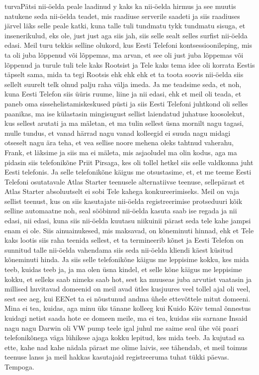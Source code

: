 turvaPätsi nii-öelda peale laadinud y kaks ka nii-öelda hirmus ja see muutis natukene seda nii-öelda teadet, mis raadiuse serverile saadeti ja siis raadiuses järvel läks selle peale katki, kuna talle tuli tundmatu tykk tundmatu sisuga, et insenerikulud, eks ole, just just aga siis jah, siis selle sealt selles surfist nii-öelda edasi. Meil turu tekkis selline olukord, kus Eesti Telefoni kontsessioonileping, mis ta oli juba lõppenud või lõppemas, ma arvan, et see oli just juba lõppemas või lõppenud ja turule tuli tele kaks Rootsist ja Tele kaks tema idee oli korrata Eestis täpselt sama, mida ta tegi Rootsis ehk ehk ehk et ta toota soovis nii-öelda siis sellelt suurelt telk olnud palju raha välja imeda. Ja me teadsime seda, et noh, kuna Eesti Telefon siis üüris ruume, liine ja nii edasi, ehk et meil oli teada, et paneb oma sissehelistamiskeskused püsti ja siis Eesti Telefoni juhtkond oli selles paanikas, ma ise külastasin mingisugust sellist laiendatud juhatuse koosolekut, kus sellest arutati ja ma mäletan, et ma tulin sellest üsna mornilt nagu tagasi, mulle tundus, et vanad härrad nagu vanad kolleegid ei suuda nagu midagi otseselt nagu ära teha, et vea sellise noore mehena oleks tahtnud vaherahu, Frank, et läksime ja siis ma ei mäleta, mis asjaoludel ma olin kodus, aga ma pidasin siis telefonikõne Priit Pirsaga, kes oli tollel hetkel siis selle valdkonna juht Eesti telefonis. Ja selle telefonikõne käigus me otsustasime, et, et me teeme Eesti Telefoni osutatavale Atlas Starter teenusele alternatiivse teenuse, sellepärast et Atlas Starter absoluutselt ei sobi Tele kahega konkureerimiseks. Meil on vaja sellist teenust, kus on siis kasutajate nii-öelda registreerimise protseduuri kõik selline automaatne noh, seal sööbinud nii-öelda kasuta saab ise regada ja nii edasi, nii edasi, kuna siis nii-öelda kuutasu niikuinii pärast seda tele kahe jampsi enam ei ole. Siis ainuainukesed, mis maksavad, on kõneminuti hinnad, ehk et Tele kaks lootis siis raha teenida sellest, et ta termineerib kõnet ja Eesti Telefon on sunnitud talle nii-öelda vahendama siis seda nii-öelda kliendi käest küsitud kõneminuti hinda. Ja siis selle telefonikõne käigus me leppisime kokku, kes mida teeb, kuidas teeb ja, ja ma olen üsna kindel, et selle kõne käigus me leppisime kokku, et selleks saab nimeks saab hot, sest ka muuseas juba arvutist vaatasin ja millised huvitavad domeenid on meil avad ütles kusjuures veel tollel ajal oli veel, sest see aeg, kui EENet ta ei nõustunud andma ühele ettevõttele mitut domeeni. Mina ei tea, kuidas, aga minu üks tänane kolleeg kui Kuido Kõiv temal õnnestus kuidagi netist saada hote ee domeen meile, ma ei tea, kuidas siis sarnane Insaid nagu nagu Darwin oli VW pump teele igal juhul me saime seal ühe või paari telefonikõnega väga lühikese ajaga kokku lepitud, kes mida teeb. Ja kujutad sa ette, kahe nad kahe nädala pärast me olime laivis, see tähendab, et meil toimus teenuse lanss ja meil hakkas kasutajaid registreeruma tuhat tükki päevas. Tempoga.
